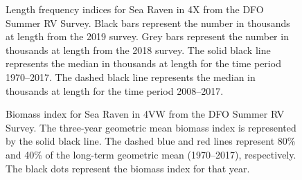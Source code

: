 \documentclass[11pt]{book}
\begin{document}
\begin{figure}[htb]

{\centering {} 

}

\caption{Length frequency indices for Sea Raven in 4X from the DFO Summer RV Survey. Black bars represent the number in thousands at length from the 2019 survey. Grey bars represent the number in thousands at length from the 2018 survey. The solid black line represents the median in thousands at length for the time period 1970--2017. The dashed black line represents the median in thousands at length for the time period 2008--2017.}\label{fig:115-fig-searaven-lengthfreq4X}
\end{figure}

\begin{figure}[htb]

{\centering {} 

}

\caption{Biomass index for Sea Raven in 4VW from the DFO Summer RV Survey. The three-year geometric mean biomass index is represented by the solid black line. The dashed blue and red lines represent 80\% and 40\% of the long-term geometric mean (1970--2017), respectively. The black dots represent the biomass index for that year.}\label{fig:116-fig-searaven-biomass4VW}
\end{figure}
\end{document}
